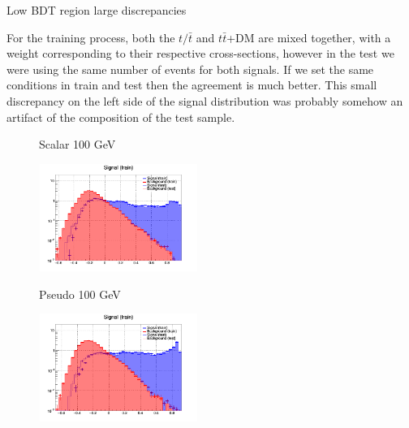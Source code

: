 \documentclass[8pt]{beamer}
\begin{document}
\begin{frame}{Low BDT region large discrepancies}
\justifying
%

For the training process, both the $t/\bar t$ and $t \bar t$+DM are mixed together, with a weight
corresponding to their respective cross-sections, however in the test we were using the same number of events for both signals. If we set the same conditions in train and test then the agreement is much better. \vfill 
This small discrepancy on the left side of the signal distribution was probably somehow an artifact of the composition of the test sample. \vfill

\begin{figure}[htbp]
\centering
\begin{minipage}[b]{.49\textwidth}
\vspace{-5pt}
\begin{block}{\centering Scalar 100 GeV}\end{block}
\begin{center}
\includegraphics[width=5.2cm, height=3.5cm]{figs/log_scalar_overtraining_100GeV_TTbar_v2.png}
\end{center}
\end{minipage}
\begin{minipage}[b]{.02\textwidth}\end{minipage}
\begin{minipage}[b]{.49\textwidth}
\vspace{-5pt}
\begin{block}{\centering Pseudo 100 GeV}\end{block}
\begin{center}
\includegraphics[width=5.2cm, height=3.5cm]{figs/log_pseudo_overtraining_100GeV_TTbar_v2.png}
\end{center}
\end{minipage}
\end{figure}


\end{frame}
\end{document}
